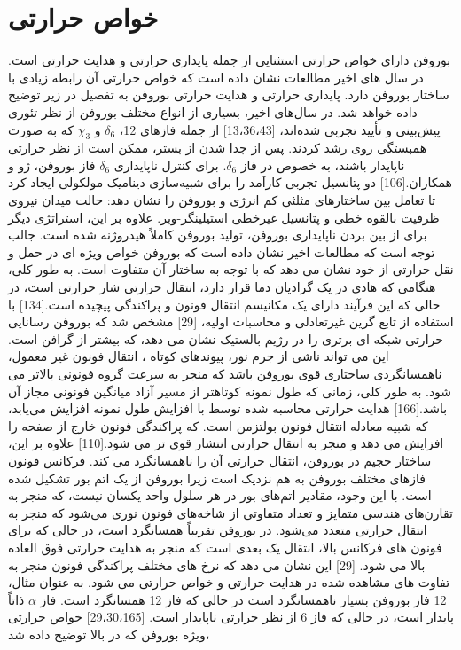 \section{خواص حرارتی}
بوروفن دارای خواص حرارتی استثنایی از جمله پایداری حرارتی و هدایت حرارتی است. در سال های اخیر مطالعات نشان داده است که خواص حرارتی آن رابطه زیادی با ساختار بوروفن دارد. پایداری حرارتی و هدایت حرارتی بوروفن به تفصیل در زیر توضیح داده خواهد شد. در سال‌های اخیر، بسیاری از انواع مختلف بوروفن از نظر تئوری پیش‌بینی و تأیید تجربی شده‌اند، \cite{fengExperimentalRealizationTwodimensional2016, mannixSynthesisBorophenesAnisotropic2015, wuTwoDimensionalBoronMonolayer2012}[13،36،43] از جمله فازهای 12، $\delta_6$ و $\chi_3$ که به صورت همبستگی روی  رشد کردند. پس از جدا شدن از بستر، ممکن است از نظر حرارتی ناپایدار باشند، به خصوص در فاز $\delta_6$. برای کنترل ناپایداری $\delta_6$ فاز بوروفن، ژو و همکاران.\cite{zhouMolecularDynamicsSimulations2017}[106] دو پتانسیل تجربی کارآمد را برای شبیه‌سازی دینامیک مولکولی ایجاد کرد تا تعامل بین ساختارهای مثلثی کم انرژی و بوروفن را نشان دهد: حالت میدان نیروی ظرفیت بالقوه خطی و پتانسیل غیرخطی استیلینگر-وبر. علاوه بر این، استراتژی دیگر برای از بین بردن ناپایداری بوروفن، تولید بوروفن کاملاً هیدروژنه شده است. جالب توجه است که مطالعات اخیر نشان داده است که بوروفن خواص ویژه ای در حمل و نقل حرارتی از خود نشان می دهد که با توجه به ساختار آن متفاوت است. به طور کلی، هنگامی که هادی در یک گرادیان دما قرار دارد، انتقال حرارتی شار حرارتی است، در حالی که این فرآیند دارای یک مکانیسم انتقال فونون و پراکندگی پیچیده است.[134] با استفاده از تابع گرین غیرتعادلی  و محاسبات اولیه، \cite{zhouSuperiorLatticeThermal2017}[29] مشخص شد که بوروفن رسانایی حرارتی شبکه ای برتری را در رژیم بالستیک نشان می دهد، که بیشتر از گرافن است. این می تواند ناشی از جرم نور، پیوندهای کوتاه ، انتقال فونون غیر معمول، ناهمسانگردی ساختاری قوی بوروفن باشد که منجر به سرعت گروه فونونی بالاتر می شود. به طور کلی، زمانی که طول نمونه کوتاهتر از مسیر آزاد میانگین فونونی مجاز آن باشد.\cite{mortazaviAnomalousStrainEffect2017}[166] هدایت حرارتی محاسبه شده توسط  با افزایش طول نمونه افزایش می‌یابد، که شبیه معادله انتقال فونون بولتزمن است. که پراکندگی فونون خارج از صفحه را افزایش می دهد و منجر به انتقال حرارتی انتشار قوی تر می شود.\cite{liuRecentProgressGrapheneanalogous2019}[110] علاوه بر این، ساختار حجیم در بوروفن، انتقال حرارتی آن را ناهمسانگرد می کند. فرکانس فونون فازهای مختلف بوروفن به هم نزدیک است زیرا بوروفن از یک اتم بور تشکیل شده است. با این وجود، مقادیر اتم‌های بور در هر سلول واحد یکسان نیست، که منجر به تقارن‌های هندسی متمایز و تعداد متفاوتی از شاخه‌های فونون نوری می‌شود که منجر به انتقال حرارتی متعدد می‌شود. در بوروفن تقریباً همسانگرد است، در حالی که برای فونون های فرکانس بالا، انتقال یک بعدی است که منجر به هدایت حرارتی فوق العاده بالا می شود. \cite{zhouSuperiorLatticeThermal2017}[29] این نشان می دهد که نرخ های مختلف پراکندگی فونون منجر به تفاوت های مشاهده شده در هدایت حرارتی و خواص حرارتی می شود. به عنوان مثال، 12 فاز بوروفن بسیار ناهمسانگرد است در حالی که فاز 12 همسانگرد است. فاز $\alpha$ ذاتاً پایدار است، در حالی که فاز 6 از نظر حرارتی ناپایدار است. \cite{zhouSuperiorLatticeThermal2017, xiaoLatticeThermalConductivity2017}\cite{tsafackThermomechanicalAnalysisTwodimensional2016}[29،30،165] خواص حرارتی ویژه بوروفن که در بالا توضیح داده شد، 